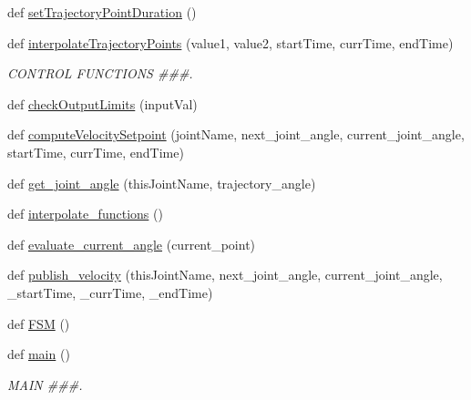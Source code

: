 \begin{DoxyCompactItemize}
\item 
def \mbox{\hyperlink{namespacejoint__angle__velocity__factor__test_a8ccd55a57db9549655bb635bb0631dff}{set\+Trajectory\+Point\+Duration}} ()
\item 
def \mbox{\hyperlink{namespacejoint__angle__velocity__factor__test_a96be0e7e41607b97a26afe981b09f7eb}{interpolate\+Trajectory\+Points}} (value1, value2, start\+Time, curr\+Time, end\+Time)
\begin{DoxyCompactList}\small\item\em C\+O\+N\+T\+R\+OL F\+U\+N\+C\+T\+I\+O\+NS \#\#\#. \end{DoxyCompactList}\item 
def \mbox{\hyperlink{namespacejoint__angle__velocity__factor__test_a7f277f0054fee93e381fa7cc521e84b1}{check\+Output\+Limits}} (input\+Val)
\item 
def \mbox{\hyperlink{namespacejoint__angle__velocity__factor__test_a26a2f9375796bb26ff0160fd97507015}{compute\+Velocity\+Setpoint}} (joint\+Name, next\+\_\+joint\+\_\+angle, current\+\_\+joint\+\_\+angle, start\+Time, curr\+Time, end\+Time)
\item 
def \mbox{\hyperlink{namespacejoint__angle__velocity__factor__test_a95a904c83e1da11f17d2fd1270d87bdf}{get\+\_\+joint\+\_\+angle}} (this\+Joint\+Name, trajectory\+\_\+angle)
\item 
def \mbox{\hyperlink{namespacejoint__angle__velocity__factor__test_ae3a8f22ed862a16963f55dd37c335355}{interpolate\+\_\+functions}} ()
\item 
def \mbox{\hyperlink{namespacejoint__angle__velocity__factor__test_a5477dfc158501561a43ab3b829e0ad12}{evaluate\+\_\+current\+\_\+angle}} (current\+\_\+point)
\item 
def \mbox{\hyperlink{namespacejoint__angle__velocity__factor__test_ab606d4f2199d00da06c6035cce974ad4}{publish\+\_\+velocity}} (this\+Joint\+Name, next\+\_\+joint\+\_\+angle, current\+\_\+joint\+\_\+angle, \+\_\+start\+Time, \+\_\+curr\+Time, \+\_\+end\+Time)
\item 
def \mbox{\hyperlink{namespacejoint__angle__velocity__factor__test_a898aa5c136aa22dc5fdaea526a11075e}{F\+SM}} ()
\item 
def \mbox{\hyperlink{namespacejoint__angle__velocity__factor__test_ac92c8f49e7d1bffcde6d715e331beb5f}{main}} ()
\begin{DoxyCompactList}\small\item\em M\+A\+IN \#\#\#. \end{DoxyCompactList}\end{DoxyCompactItemize}
